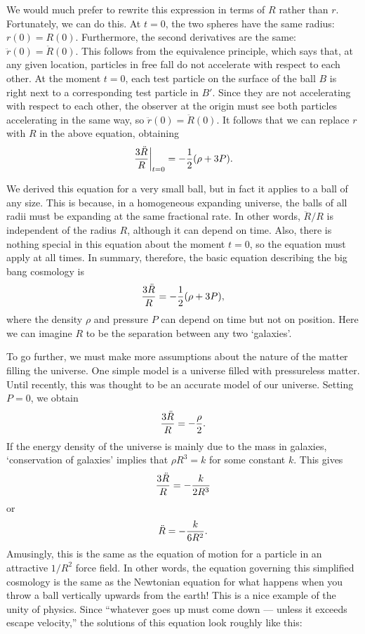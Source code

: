 We would much prefer to rewrite this expression in terms of $R$ 
rather than $r$.  Fortunately, we can do this.  
At $t=0$, the two spheres have the same radius: $r(0)=R(0)$.  Furthermore, 
the second derivatives are the same: $\ddot r(0) = \ddot R(0)$.  This 
follows from the equivalence principle, which says that, at any given 
location, particles in free fall do not accelerate with respect to each 
other.  At the moment $t=0$, each test particle on the surface of
the ball $B$ is right next to a corresponding test particle in $B'$.  
Since they are not accelerating with respect to each other, the observer 
at the origin must see both particles accelerating in the same way,
so $\ddot r(0) = \ddot R(0)$.
It follows that we can replace $r$ with $R$ in the above equation,
obtaining
\[ \left.{3\ddot R\over R}\right|_{t=0} = -{1\over 2}(\rho + 3 P)  .\]

We derived this equation for a very small ball, but
in fact it applies to a ball of any size.  This is because, in a
homogeneous expanding universe, the balls of all radii
must be expanding at the same fractional rate.  In other words,
$\ddot R/R$ is independent of the radius $R$, although
it can depend on time.  Also, there is nothing special in
this equation about the moment $t=0$, so the equation must
apply at all times.  In summary, therefore, the basic equation
describing the big bang cosmology is
\begin{equation}  {3\ddot R\over R} = -{1\over 2}(\rho + 3 P),
\label{bang}
\end{equation}
where the density $\rho$ and pressure $P$ can depend on time but
not on position.  Here we can imagine $R$ to be the separation 
between any two `galaxies'. 

To go further, we must make more assumptions about the nature of
the matter filling the universe.  One simple model is a universe
filled with pressureless matter.  Until recently, this
was thought to be an accurate model of our universe.  Setting $P=0$, we 
obtain 
\[  {3\ddot R\over R} = -{\rho \over 2} . \]
If the energy density of the universe is mainly due to the mass
in galaxies, `conservation of galaxies' implies that $\rho R^3 = k$ 
for some constant $k$.  This gives
\[  {3\ddot R\over R} = - {k \over 2 R^3}  \]
or
\[   \ddot R = -{k \over 6 R^2}  .\]
Amusingly, this is the same as the equation of motion for a particle in
an attractive $1/R^2$ force field.  In other words, the equation 
governing this simplified cosmology is the same as the Newtonian
equation for what happens when you throw a ball vertically upwards from
the earth!  This is a nice example of the unity of physics.  Since
``whatever goes up must come down --- unless it exceeds escape velocity,''
the solutions of this equation look roughly like this:

